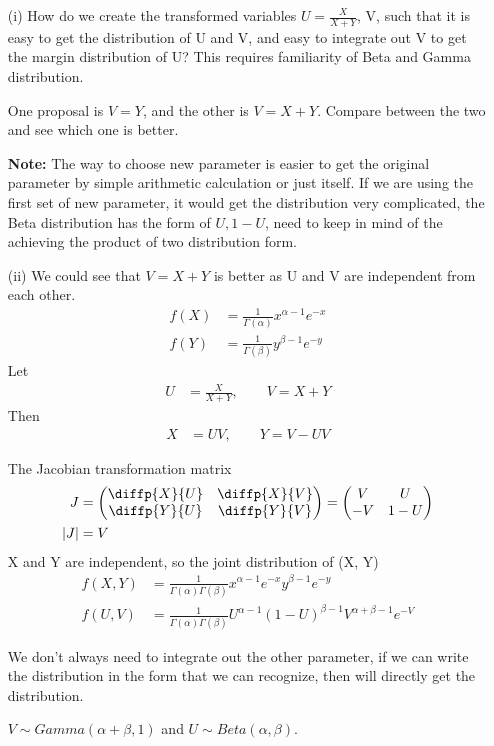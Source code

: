 \documentclass[11pt]{article} %
\begin{document}
\begin{itemize}
	\item [(i)] How do we create the transformed variables $U= \frac{X}{X+Y} $, V, such that it is easy to get the distribution of U and V, and easy to integrate out V to get the margin distribution of U? This requires familiarity of Beta and Gamma distribution.
	
	One proposal is $V= Y$, and the other is $V= X+Y$. Compare between the two and see which one is better.
	
	\textbf{Note:} The way to choose new parameter is easier to get the original parameter by simple arithmetic calculation or just itself.
	If we are using the first set of new parameter, it would get the distribution very complicated, the Beta distribution has the form of $U, 1-U$, need to keep in mind of the achieving the product of two distribution form. 
	
	
	
	\item[(ii)] We could see that $V=X+Y$ is better as U and V are independent from each other.
\begin{align*}
	f(X) &= \frac{1}{\Gamma{(\alpha)}} x^{\alpha-1} e^{-x}\\
	f(Y) &= \frac{1}{\Gamma{(\beta)}} y^{\beta-1} e^{-y}
\end{align*}	
Let
\begin{align*}
	U &= \frac{X}{X+Y}, \qquad V = X + Y
\end{align*}	
Then
\begin{align*}
	X &= UV, \qquad Y = V - UV
\end{align*}
	 	
The Jacobian transformation matrix
\begin{align*}
	J &= \begin{pmatrix}
		\diffp{X}{U} & \diffp{X}{V} \\
		\diffp{Y}{U} & \diffp{Y}{V} 
	\end{pmatrix} =  \begin{pmatrix}
	V & U \\
	-V & 1-U
\end{pmatrix}\\
|J| &= V
\end{align*}
X and Y are independent, so the joint distribution of (X, Y) 
\begin{align*}
	f(X, Y) &= \frac{1}{\Gamma{(\alpha)} \Gamma{(\beta)}} x^{\alpha -1} e^{-x} y^{\beta -1} e^{-y}\\
	f(U, V) &= \frac{1}{\Gamma{(\alpha)} \Gamma{(\beta)}} U^{\alpha -1} (1-U)^{\beta -1} V^{\alpha + \beta -1} e^{-V}
\end{align*}

We don't always need to integrate out the other parameter, if we can write the distribution in the form that we can recognize, then will directly get the distribution. 

$V \sim Gamma (\alpha + \beta, 1)$ and $U \sim Beta(\alpha, \beta)$.

\end{itemize}
\end{document}
